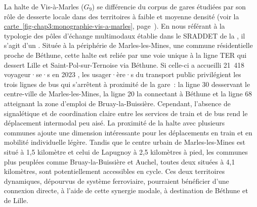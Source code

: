 \begin{refsegment}
La halte de Vis-à-Marles (\(G_9\)) se différencie du corpus de gares étudiées par son rôle de desserte locale dans des territoires à faible et moyenne densité (voir la \hyperref[fig-chap3:monographie-vis-a-marles]{carte~\ref{fig-chap3:monographie-vis-a-marles}}, page~\pageref{fig-chap3:monographie-vis-a-marles}). En nous référant à la typologie des pôles d'échange multimodaux établie dans le \acrshort{SRADDET} de la \textcolor{blue}{\textcite[82]{region_hauts-de-france_sraddet_2024}}, il s'agit d'un . Située à la périphérie de Marles-les-Mines, une commune résidentielle proche de Béthune, cette halte est reliée par une voie unique à la ligne \acrshort{TER} qui dessert Lille et Saint-Pol-sur-Ternoise via Béthune. Si celle-ci a accueilli 21~418 voyageur·se·s en 2023 \textcolor{blue}{\autocite{sncf_frequentation_2024}}, les usager·ère·s du transport public privilégient les trois lignes de bus qui s'arrêtent à proximité de la gare~: la ligne 30 desservant le centre-ville de Marles-les-Mines, la ligne 20 la connectant à Béthune et la ligne 68 atteignant la zone d'emploi de Bruay-la-Buissière. Cependant, l'absence de signalétique et de coordination claire entre les services de train et de bus rend le déplacement intermodal peu aisé. La proximité de la halte avec plusieurs communes ajoute une dimension intéressante pour les déplacements en train et en mobilité individuelle légère. Tandis que le centre urbain de Marles-les-Mines est situé à 1,5 kilomètre et celui de Lapugnoy à 2,5 kilomètres à pied, les communes plus peuplées comme Bruay-la-Buissière et Auchel, toutes deux situées à 4,1 kilomètres, sont potentiellement accessibles en cycle. Ces deux territoires dynamiques, dépourvus de système ferroviaire, pourraient bénéficier d'une connexion directe, à l'aide de cette synergie modale, à destination de Béthune et de Lille.%



\end{refsegment}
